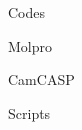 \begin{section}{Codes}
\begin{subsection}{Molpro}
\end{subsection}
\begin{subsection}{CamCASP}
\end{subsection}
\begin{subsection}{Scripts}
\end{subsection}
\end{section}
